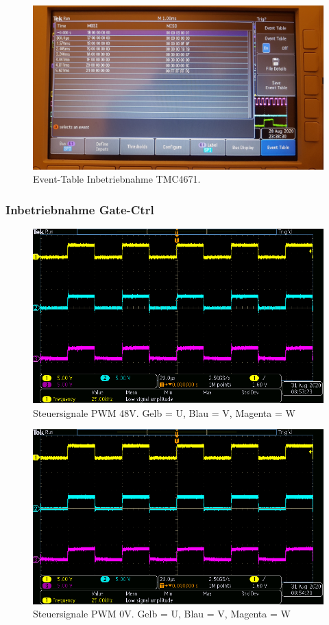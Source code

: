\begin{figure}[H]
\center
\includegraphics[width = \textwidth]{graphics/TMC4671_TimeTable_Lesen_Bild}
\caption{Event-Table Inbetriebnahme TMC4671.}
\label{fig:TMC4671_TimeTable_Lesen_Bild}
\end{figure}

\newpage

\subsubsection{Inbetriebnahme Gate-Ctrl}\label{Appendix:TMC4671_Gate_Ctrl}

\begin{figure}[H]
\center
\includegraphics[width = \textwidth]{graphics/TMC4671_Gate_Signal_H}
\caption{Steuersignale PWM 48V. Gelb = U, Blau = V, Magenta = W}
\label{fig:TMC4671_Gate_Signal_H}
\end{figure}

\begin{figure}[H]
\center
\includegraphics[width = \textwidth]{graphics/TMC4671_Gate_Signal_L}
\caption{Steuersignale PWM 0V. Gelb = U, Blau = V, Magenta = W}
\label{fig:TMC4671_Gate_Signal_L}
\end{figure}